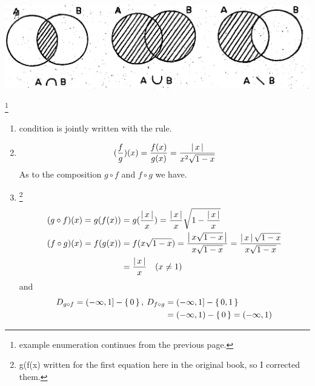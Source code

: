 \documentclass[11pt]{amsbook}
\begin{document}
\includegraphics[scale=0.3]{images/b1p1-021-fig01}
\begin{exmp}
	\footnote{example enumeration continues from the previous page.}
	\begin{enumerate}
		\item condition is jointly written with the rule.
		\item \begin{align*}
			(\frac{f}{g})(x) = \frac{f(x)}{g(x)} = \frac{\left \lvert \, x \, \right \rvert}{x^{2}\sqrt{1-x}}
		\end{align*}
		As to the composition $g \circ f$ and $f \circ g$ we have.
		\item \footnote{g(f(x) written for the first equation here in the original book, so I corrected them.}
		\begin{align*}
			(g \circ f)(x) = g(f(x)) &= g(\frac{\left \lvert \, x \, \right \rvert}{x}) = \frac{\left \lvert \, x \, \right \rvert}{x}\sqrt{1-\frac{\left \lvert \, x \, \right \rvert}{x}} \\
			(f \circ g)(x) = f(g(x)) &= f(x\sqrt{1-x}) = \frac{\left \lvert \, x\sqrt{1-x} \, \right \rvert}{x\sqrt{1-x}} = \frac{\left \lvert \, x \, \right \rvert\sqrt{1-x}}{x\sqrt{1-x}} \\
			&= \frac{\left \lvert \, x \, \right \rvert}{x} \quad (x \neq 1)
		\end{align*}
		and \begin{align*}
			D_{g \circ f} = (-\infty, 1] -  \left \{ \, 0 \, \right \} , \: D_{f \circ g} &= (-\infty, 1] -  \left \{ \, 0,1 \, \right \}  \\
			&= (-\infty, 1) -  \left \{ \, 0 \, \right \}  = (-\infty, 1)
		\end{align*}
	\end{enumerate}
\end{exmp}
\end{document}

